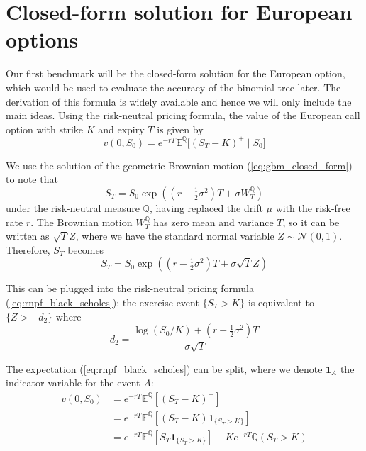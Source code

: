\section{Closed-form solution for European options}

Our first benchmark will be the closed-form solution for the European option, which would be used to evaluate the accuracy of the binomial tree later. The derivation of this formula is widely available and hence we will only include the main ideas. Using the risk-neutral pricing formula, the value of the European call option with strike $K$ and expiry $T$ is given by
\begin{equation}
    v(0, S_0) = e^{-rT}\mathbb E^\mathbb Q\big[(S_T - K)^+ \mid S_0\big]
\label{eq:rnpf_black_scholes}
\end{equation}

We use the solution of the geometric Brownian motion (\ref{eq:gbm_closed_form}) to note that
\begin{equation}
    S_T = S_0 \exp \left( (r-\tfrac 12 \sigma^2)T + \sigma W_T^{\mathbb Q}\right)
\end{equation}
under the risk-neutral measure $\mathbb Q$, having replaced the drift $\mu$ with the risk-free rate $r$. The Brownian motion $W_T^{\mathbb Q}$ has zero mean and variance $T$, so it can be written as $\sqrt T Z$, where we have the standard normal variable $Z \sim \mathcal N(0, 1)$. Therefore, $S_T$ becomes
\begin{equation}
    S_T = S_0 \exp \left( (r-\tfrac 12 \sigma^2)T + \sigma \sqrt{T} Z\right)
\end{equation}

This can be plugged into the risk-neutral pricing formula (\ref{eq:rnpf_black_scholes}): the exercise event $\{S_T > K\}$ is equivalent to $\{Z > -d_2\}$ where
\begin{equation}
    d_2 = \frac{\log(S_0/K) + (r - \tfrac 12 \sigma^2)T}{\sigma \sqrt T}
\end{equation}

The expectation (\ref{eq:rnpf_black_scholes}) can be split, where we denote $\boldsymbol 1_{A}$ the indicator variable for the event $A$:
\begin{align}
    v(0, S_0) &= e^{-rT} \mathbb E^\mathbb Q[(S_T - K)^+] \\
    &= e^{-rT} \mathbb E^\mathbb Q[(S_T - K) \boldsymbol{1}_{\{S_T > K\}}] \\
    &= e^{-rT} \mathbb E^\mathbb Q[S_T \boldsymbol{1}_{\{S_T > K\}}] - Ke^{-rT} \mathbb Q(S_T > K)
\end{align}

